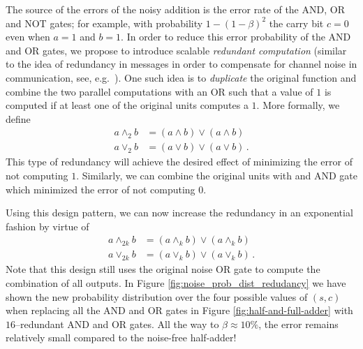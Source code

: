 \label{sec:redundant_adders}
The source of the errors of the noisy addition is the error rate of the AND, OR and NOT gates; for example, with probability $1-(1-\beta)^2$ the carry bit $c=0$ even when $a=1$ and $b=1$. In order to reduce this error probability of the AND and OR gates, we propose to introduce scalable {\em redundant computation} (similar to the idea of redundancy in messages in order to compensate for channel noise in communication, see, e.g.\ \cite{Sha1948k}). One such idea is to {\em duplicate} the original function and combine the two parallel computations with an OR such that a value of $1$ is computed if at least one of the original units computes a $1$. More formally, we define
\begin{align}
    a \land_2 b & = (a \land b) \lor (a \land b)   \\
    a \lor_2 b  & = (a \lor b) \lor (a \lor b) \,.
\end{align}
This type of redundancy will achieve the desired effect of minimizing the error of not computing $1$. Similarly, we can combine the original units with and AND gate which minimized the error of not computing $0$.

Using this design pattern, we can now increase the redundancy in an exponential fashion by virtue of
\begin{align}
    a \land_{2k} b & = (a \land_k b) \lor (a \land_k b)   \\
    a \lor_{2k} b  & = (a \lor_k b) \lor (a \lor_k b) \,.
\end{align}
Note that this design still uses the original noise OR gate to compute the combination of all outputs. In Figure \ref{fig:noise_prob_dist_redudancy} we have shown the new probability distribution over the four possible values of $(s,c)$ when replacing all the AND and OR gates in Figure \ref{fig:half-and-full-adder} with $16$--redundant AND and OR gates. All the way to $\beta \approx 10\%$, the error remains relatively small compared to the noise-free half-adder!


